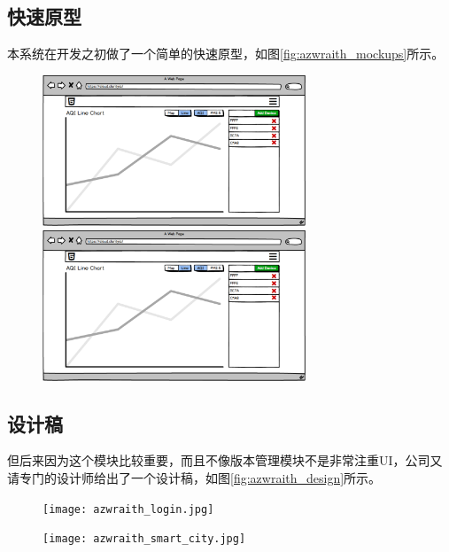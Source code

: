 \subsection{快速原型}
本系统在开发之初做了一个简单的快速原型，如图\ref{fig:azwraith_mockups}所示。
\begin{figure}[H]
 \centering
 \includegraphics[width=0.7\textwidth]{pdf/azwraith_prototype.pdf}
 
 \vspace{0.1cm}
 
 \includegraphics[width=0.7\textwidth, page=2]{pdf/azwraith_prototype.pdf}
\end{figure}

\subsection{设计稿}
但后来因为这个模块比较重要，而且不像版本管理模块不是非常注重UI，公司又请专门的设计师给出了一个设计稿，如图\ref{fig:azwraith_design}所示。
\begin{figure}[htb]
 \centering
 \texttt{[image: azwraith\_login.jpg]}

 \vspace{0.1cm}

 \texttt{[image: azwraith\_smart\_city.jpg]}
\end{figure}

